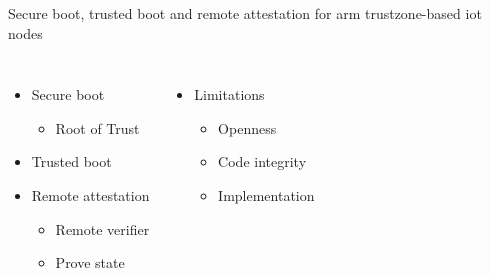 \documentclass[]{beamer}
\begin{document}
\begin{frame}{Secure boot, trusted boot and remote attestation for arm trustzone-based iot nodes}
\begin{columns}
\begin{itemize}
\item Secure boot \begin{itemize}
\item Root of Trust
\end{itemize}
\item Trusted boot
\item Remote attestation \begin{itemize}
\item Remote verifier
\item Prove state
\end{itemize}
\end{itemize}
\begin{itemize}
\item Limitations \begin{itemize}
\item Openness
\item Code integrity
\item Implementation
\end{itemize}
\end{itemize}
\end{columns}
\bigskip
{}
\end{frame}

\end{document}
